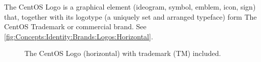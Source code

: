 \noindent The CentOS Logo is a graphical element (ideogram, symbol,
emblem, icon, sign) that, together with its logotype (a uniquely set
and arranged typeface) form The CentOS Trademark or commercial brand.
See \autoref{fig:Concepts:Identity:Brands:Logos:Horizontal}.

\begin{figure}
\begin{center}
\end{center}
\caption{The CentOS Logo (horizontal) with trademark (TM) included.%
    \label{fig:Concepts:Identity:Brands:Logos:Horizontal}}
\end{figure}
